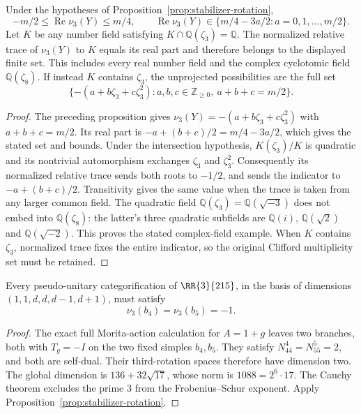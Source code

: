 \begin{corollary}
\label{cor:stabilizer-average}
Under the hypotheses of Proposition~\ref{prop:stabilizer-rotation},
\[
 -m/2\le\operatorname{Re}\nu_3(Y)\le m/4,
 \qquad
 \operatorname{Re}\nu_3(Y)\in
 \{m/4-3a/2: a=0,1,\ldots,m/2\}.
\]
Let $K$ be any number field satisfying
$K\cap\mathbb Q(\zeta_3)=\mathbb Q$. The normalized relative trace of
$\nu_3(Y)$ to $K$ equals its real part and therefore belongs to the
displayed finite set. This includes every real number field and the
complex cyclotomic field $\mathbb Q(\zeta_8)$.
If instead $K$ contains $\zeta_3$, the unprojected possibilities are the
full set
\[
 \{-(a+b\zeta_3+c\zeta_3^2):
       a,b,c\in\mathbb Z_{\ge0},\ a+b+c=m/2\}.
\]
\end{corollary}
\begin{proof}
The preceding proposition gives
$\nu_3(Y)=-(a+b\zeta_3+c\zeta_3^2)$ with $a+b+c=m/2$.
Its real part is $-a+(b+c)/2=m/4-3a/2$, which gives the stated set and
bounds. Under the intersection hypothesis, $K(\zeta_3)/K$ is quadratic
and its nontrivial automorphism exchanges $\zeta_3$ and $\zeta_3^2$.
Consequently its normalized relative trace sends both roots to $-1/2$,
and sends the indicator to $-a+(b+c)/2$. Transitivity gives the same
value when the trace is taken from any larger common field.
The quadratic field $\mathbb Q(\zeta_3)=\mathbb Q(\sqrt{-3})$ does not
embed into $\mathbb Q(\zeta_8)$: the latter's three quadratic subfields
are $\mathbb Q(i)$, $\mathbb Q(\sqrt2)$ and
$\mathbb Q(\sqrt{-2})$. This proves the stated complex-field example.
When $K$ contains $\zeta_3$, normalized trace fixes the entire indicator,
so the original Clifford multiplicity set must be retained.
\end{proof}


\begin{corollary}\label{cor:frontier-third-indicators}
Every pseudo-unitary categorification of $\RR{3}{215}$, in the basis
of dimensions $(1,1,d,d,d-1,d+1)$, must satisfy
\[
 \nu_3(b_4)=\nu_3(b_5)=-1.
\]
\end{corollary}
\begin{proof}
The exact full Morita-action calculation for $A=1+g$ leaves two branches,
both with $T_g=-I$ on the two fixed simples $b_4,b_5$.
They satisfy $N_{44}^{4}=N_{55}^{5}=2$, and both are self-dual.
Their third-rotation spaces therefore have dimension two.
The global dimension is $136+32\sqrt{17}$, whose norm is
$1088=2^6\cdot17$. The Cauchy theorem
\cite[Theorem~3.9]{BNRW} excludes the prime $3$ from the
Frobenius--Schur exponent. Apply
Proposition~\ref{prop:stabilizer-rotation}.
\end{proof}

